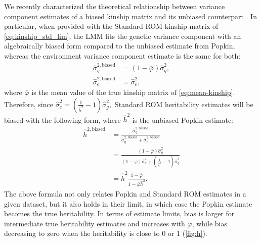 \documentclass[11pt]{article}
\begin{document}
We recently characterized the theoretical relationship between variance component estimates of a biased kinship matrix and its unbiased counterpart \citep{hou2023genetic}.
In particular, when provided with the Standard ROM kinship matrix of \cref{eq:kinship_std_lim}, the LMM fits the genetic variance component with an algebraically biased form compared to the unbiased estimate from Popkin, whereas the environment variance component estimate is the same for both:
\begin{align*}
  \hat{\sigma}^{2,\text{biased}}_g
  &=
    (1 - \bar{\varphi}) \hat{\sigma}^2_g
    , \\
  \hat{\sigma}^{2,\text{biased}}_e
  &=
    \hat{\sigma}^2_e
    ,
\end{align*}
where $\bar{\varphi}$ is the mean value of the true kinship matrix of \cref{eq:mean-kinship}.
Therefore, since
$
\hat{\sigma}^2_e  
=
\left( \frac{ 1 }{ \hat{h}^2 } - 1 \right) \hat{\sigma}^2_g 
,
$
Standard ROM heritability estimates will be biased with the following form, where $\hat{h}^2$ is the unbiased Popkin estimate:
\begin{equation}
\label{eq:bias-std-rom}
\begin{split}
  \hat{h}^{2,\text{biased}}
  &=
    \frac{
    \hat{\sigma}^{2,\text{biased}}_g
    }{
    \hat{\sigma}^{2,\text{biased}}_g + \hat{\sigma}^{2,\text{biased}}_e
    }
  \\
  &=
    \frac{
    (1 - \bar{\varphi}) \hat{\sigma}^2_g
    }{
    (1 - \bar{\varphi}) \hat{\sigma}^2_g
    + \left( \frac{ 1 }{ \hat{h}^2 } - 1 \right) \hat{\sigma}^2_g 
    }
  \\
  &=
    \hat{h}^2
    \frac{
    1 - \bar{\varphi}
    }{
    1 - \bar{\varphi} \hat{h}^2
    }
    .
\end{split}
\end{equation}
The above formula not only relates Popkin and Standard ROM estimates in a given dataset, but it also holds in their limit, in which case the Popkin estimate becomes the true heritability.
In terms of estimate limits, bias is larger for intermediate true heritability estimates and increases with $\bar{\varphi}$, while bias decreasing to zero when the heritability is close to 0 or 1 (\cref{fig:h}).
\end{document}
